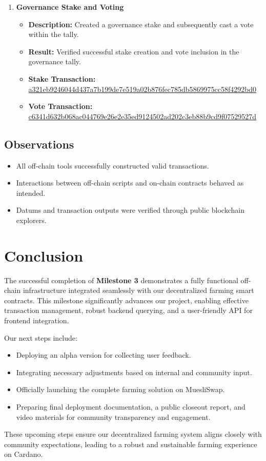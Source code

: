 \documentclass{article}
\begin{document}
\begin{enumerate}
    \item \textbf{Governance Stake and Voting}
    \begin{itemize}
        \item \textbf{Description:} Created a governance stake and subsequently cast a vote within the tally.
        \item \textbf{Result:} Verified successful stake creation and vote inclusion in the governance tally.
        \item \textbf{Stake Transaction:} \href{https://preprod.cexplorer.io/tx/a321eb9246044d437a7b199de7e519a02b876fec785db5869975cc58f4292bd0}{a321eb9246044d437a7b199de7e519a02b876fec785db5869975cc58f4292bd0}\\
        \item \textbf{Vote Transaction:} \href{https://preprod.cexplorer.io/tx/c6341d632b068ac044769e26e2e35ed9124502ad202c3eb88b9cd9f07529527d}{c6341d632b068ac044769e26e2e35ed9124502ad202c3eb88b9cd9f07529527d}
    \end{itemize}

\end{enumerate}

\subsection{Observations}
\begin{itemize}
    \item All off-chain tools successfully constructed valid transactions.
    \item Interactions between off-chain scripts and on-chain contracts behaved as intended.
    \item Datums and transaction outputs were verified through public blockchain explorers.
\end{itemize}

\section{Conclusion}

The successful completion of \textbf{Milestone 3} demonstrates a fully functional off-chain infrastructure integrated seamlessly with our decentralized farming smart contracts. This milestone significantly advances our project, enabling effective transaction management, robust backend querying, and a user-friendly API for frontend integration.

Our next steps include:

\begin{itemize}
    \item Deploying an alpha version for collecting user feedback.
    \item Integrating necessary adjustments based on internal and community input.
    \item Officially launching the complete farming solution on MuesliSwap.
    \item Preparing final deployment documentation, a public closeout report, and video materials for community transparency and engagement.
\end{itemize}

These upcoming steps ensure our decentralized farming system aligns closely with community expectations, leading to a robust and sustainable farming experience on Cardano.
\end{document}
